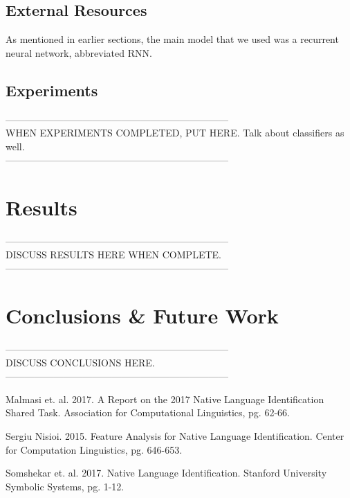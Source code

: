 \documentclass[12pt]{article}
\newcommand\tab[1][1cm]{\hspace*{#1}}
\begin{document}
\subsection{External Resources}
\tab As mentioned in earlier sections, the main model that we used was a recurrent neural network, abbreviated RNN. 
\subsection{Experiments}
---------------------------------------------------------------------\\
WHEN EXPERIMENTS COMPLETED, PUT HERE. Talk about classifiers as well.\\
---------------------------------------------------------------------\\
\section{Results}
---------------------------------------------------------------------\\
DISCUSS RESULTS HERE WHEN COMPLETE.\\
---------------------------------------------------------------------\\
\section{Conclusions \& Future Work}
---------------------------------------------------------------------\\
DISCUSS CONCLUSIONS HERE.\\
---------------------------------------------------------------------\\

\begin{thebibliography}{9}
	Malmasi et. al. 2017. A Report on the 2017 Native Language Identiﬁcation Shared Task. Association for Computational Linguistics, pg. 62-66.
	
	Sergiu Nisioi. 2015. Feature Analysis for Native Language Identiﬁcation. Center for Computation Linguistics, pg. 646-653.
	
	Somshekar et. al. 2017. Native Language Identification. Stanford University Symbolic Systems, pg. 1-12.
\end{thebibliography}
\end{document}
